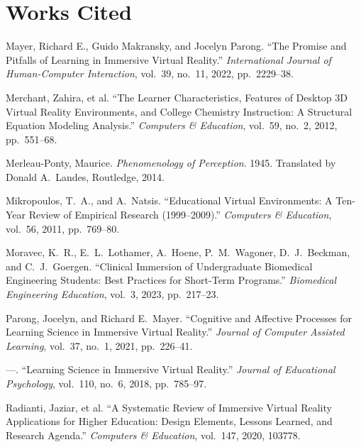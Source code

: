 \documentclass{article}
\newenvironment{workscited}
  {\section*{Works Cited}\begin{list}{}
    {\setlength{\itemindent}{-0.5in}\setlength{\leftmargin}{0.5in}
     \setlength{\itemsep}{0pt}\setlength{\parsep}{6pt}}}
  {\end{list}}
\begin{document}
\begin{workscited}
\item Mayer, Richard E., Guido Makransky, and Jocelyn Parong. ``The
Promise and Pitfalls of Learning in Immersive Virtual Reality.''
\textit{International Journal of Human-Computer Interaction}, vol.~39,
no.~11, 2022, pp.~2229--38. %

\item Merchant, Zahira, et al. ``The Learner Characteristics, Features of
Desktop 3D Virtual Reality Environments, and College Chemistry
Instruction: A Structural Equation Modeling Analysis.''
\textit{Computers \& Education}, vol.~59, no.~2, 2012, pp.~551--68.

\item Merleau-Ponty, Maurice. \textit{Phenomenology of Perception}. 1945.
Translated by Donald A.\ Landes, Routledge, 2014.

\item Mikropoulos, T.\ A., and A.\ Natsis. ``Educational Virtual
Environments: A Ten-Year Review of Empirical Research (1999--2009).''
\textit{Computers \& Education}, vol.~56, 2011, pp.~769--80.

\item Moravec, K.\ R., E.\ L.\ Lothamer, A.\ Hoene, P.\ M.\ Wagoner,
D.\ J.\ Beckman, and C.\ J.\ Goergen. ``Clinical Immersion of
Undergraduate Biomedical Engineering Students: Best Practices for
Short-Term Programs.'' \textit{Biomedical Engineering Education},
vol.~3, 2023, pp.~217--23. %

\item Parong, Jocelyn, and Richard E.\ Mayer. ``Cognitive and Affective
Processes for Learning Science in Immersive Virtual Reality.''
\textit{Journal of Computer Assisted Learning}, vol.~37, no.~1, 2021,
pp.~226--41. %

\item ---. ``Learning Science in Immersive Virtual Reality.''
\textit{Journal of Educational Psychology}, vol.~110, no.~6, 2018,
pp.~785--97.

\item Radianti, Jaziar, et al. ``A Systematic Review of Immersive Virtual
Reality Applications for Higher Education: Design Elements, Lessons
Learned, and Research Agenda.'' \textit{Computers \& Education},
vol.~147, 2020, 103778. %


\end{workscited}
\end{document}
